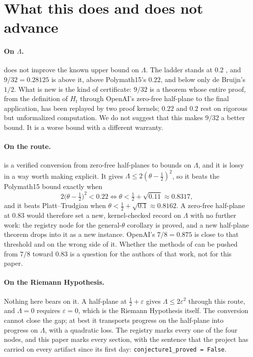 \documentclass[11pt]{article}
\theoremstyle{definition}
\newcommand{\lean}[1]{\texttt{#1}}
\newcommand{\Lam}{\Lambda}
\newcommand{\Hfun}{H}
\begin{document}
\section{What this does and does not advance}\label{sec:frontier}

\paragraph{On $\Lam$.}  does not improve the known upper bound on $\Lam$. The ladder stands at $0.2$ \cite{PT}, and $9/32 = 0.28125$ is above it, above Polymath15's $0.22$, and below only de Bruijn's $1/2$. What is new is the kind of certificate: $9/32$ is a theorem whose entire proof, from the definition of $\Hfun_t$ through OpenAI's zero-free half-plane to the final application, has been replayed by two proof kernels; $0.22$ and $0.2$ rest on rigorous but unformalized computation. We do not suggest that this makes $9/32$ a better bound. It is a worse bound with a different warranty.

\paragraph{On the route.}  is a verified conversion from zero-free half-planes to bounds on $\Lam$, and it is lossy in a way worth making explicit. It gives $\Lam \le 2(\theta - \tfrac12)^2$, so it beats the Polymath15 bound exactly when
\[
2\bigl(\theta - \tfrac12\bigr)^2 < 0.22 \iff \theta < \tfrac12 + \sqrt{0.11} \approx 0.8317,
\]
and it beats Platt--Trudgian when $\theta < \tfrac12 + \sqrt{0.1} \approx 0.8162$. A zero-free half-plane at $0.83$ would therefore set a new, kernel-checked record on $\Lam$ with no further work: the registry node for the general-$\theta$ corollary is proved, and a new half-plane theorem drops into it as a new instance. OpenAI's $7/8 = 0.875$ is close to that threshold and on the wrong side of it. Whether the methods of \cite{OAIqrh} can be pushed from $7/8$ toward $0.83$ is a question for the authors of that work, not for this paper.

\paragraph{On the Riemann Hypothesis.} Nothing here bears on it. A half-plane at $\tfrac12 + \varepsilon$ gives $\Lam \le 2\varepsilon^2$ through this route, and $\Lam = 0$ requires $\varepsilon = 0$, which is the Riemann Hypothesis itself. The conversion cannot close the gap; at best it transports progress on the half-plane into progress on $\Lam$, with a quadratic loss. The registry marks every one of the four nodes, and this paper marks every section, with the sentence that the project has carried on every artifact since its first day: \lean{conjecture1\_proved = False}.
\end{document}
